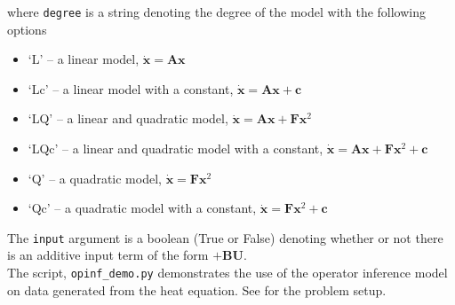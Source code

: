 \documentclass[11pt]{article} %
\newcommand{\code}[1]{\colorbox{light-gray}{\texttt{#1}}}
\newcommand{\bx}{\mathbf{x}}
\newcommand{\bA}{\mathbf{A}}
\newcommand{\bF}{\mathbf{F}}
\newcommand{\bc}{\mathbf{c}}
\begin{document}
\noindent where \code{degree} is a string denoting the degree of the model with the following options
\begin{itemize}
\item[] `L'  -- a linear model, $\dot{\bx} = \bA \bx$\\
\item[] `Lc' -- a linear model with a constant, $\dot{\bx} = \bA \bx + \bc$\\
\item[] `LQ' -- a linear and quadratic model, $\dot{\bx} = \bA \bx + \bF \bx^2$\\
\item[] `LQc' -- a linear and quadratic model with a constant, $\dot{\bx} = \bA \bx + \bF \bx^2 + \bc$\\
\item[] `Q' -- a quadratic model, $\dot{\bx} = \bF \bx^2$\\
\item[] `Qc' -- a quadratic model with a constant, $\dot{\bx} = \bF \bx^2 + \bc$
\end{itemize}
The \code{input} argument is a boolean (True or False) denoting whether or not there is an additive input term of the form $+\mathbf{B} \mathbf{U}$.\\

\noindent The script, \code{opinf\_demo.py} demonstrates the use of the operator inference model on data generated from the heat equation. See \cite{mythesis} for the problem setup. 
 
\end{document}
